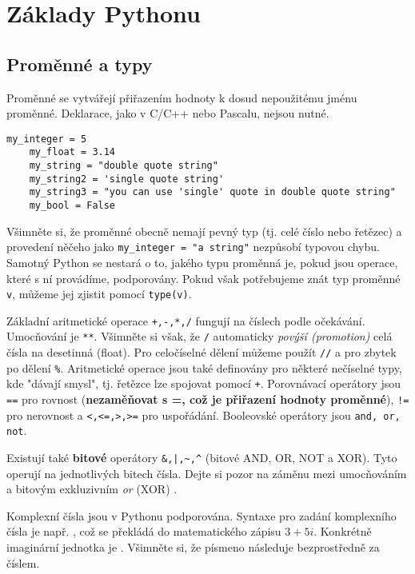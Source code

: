 \newpage
\section{Základy Pythonu}

\subsection{Proměnné a typy}

Proměnné se vytvářejí přiřazením hodnoty k dosud nepoužitému jménu proměnné. Deklarace, jako v C/C++ nebo Pascalu, nejsou nutné.
\begin{lstlisting}[caption=Definování proměnných]
    my_integer = 5
    my_float = 3.14
    my_string = "double quote string"
    my_string2 = 'single quote string'
    my_string3 = "you can use 'single' quote in double quote string"
    my_bool = False
\end{lstlisting}

Všimněte si, že proměnné obecně nemají pevný typ (tj. celé číslo nebo řetězec) a provedení něčeho jako \lstinline{my_integer = "a string"} nezpůsobí typovou chybu. Samotný Python se nestará o to, jakého typu proměnná je, pokud jsou operace, které s ní provádíme, podporovány. Pokud však potřebujeme znát typ proměnné \lstinline{v}, můžeme jej zjistit pomocí \lstinline{type(v)}.

Základní aritmetické operace \verb|+,-,*,/| fungují na číslech podle očekávání. Umocňování je \verb|**|. Všimněte si však, že \verb|/| automaticky \emph{povýší (promotion)} celá čísla na desetinná (float). Pro celočíselné dělení můžeme použít \verb|//| a pro zbytek po dělení \verb|%|. Aritmetické operace jsou také definovány pro některé nečíselné typy, kde "dávají smysl", tj. řetězce lze spojovat pomocí \verb|+|. Porovnávací operátory jsou \verb|==| pro rovnost (\textbf{nezaměňovat s =, což je přiřazení hodnoty proměnné}), \verb|!=| pro nerovnost a \verb|<,<=,>,>=| pro uspořádání. Booleovské operátory jsou \verb|and, or, not|.

Existují také \textbf{bitové} operátory \lstinline{&,|,~,^} (bitové AND, OR, NOT a XOR). Tyto operují na jednotlivých bitech čísla. Dejte si pozor na záměnu mezi umocňováním \ls{**} a bitovým exkluzivním \emph{or} (XOR) \ls{^}.

Komplexní čísla jsou v Pythonu podporována. Syntaxe pro zadání komplexního čísla je např. , což se překládá do matematického zápisu $3 + 5i$. Konkrétně imaginární jednotka je . Všimněte si, že písmeno  následuje bezprostředně za číslem.

